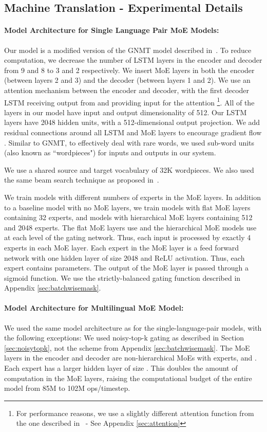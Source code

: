 \documentclass{article} \pdfoutput=1
\begin{document}
\subsection{Machine Translation - Experimental Details}
\label{sec:appendixmt}


\paragraph{Model Architecture for Single Language Pair MoE Models:} Our model is a modified version of the GNMT model described in~\citep{GNMT}.  To reduce computation, we decrease the number of LSTM layers in the encoder and decoder from 9 and 8 to 3 and 2 respectively.  We insert MoE layers in both the encoder (between layers 2 and 3) and the decoder (between layers 1 and 2). We use an attention mechanism between the encoder and decoder, with the first decoder LSTM receiving output from and providing input for the attention \footnote{For performance reasons, we use a slightly different attention function from the one described in~\citep{GNMT} - See Appendix \ref{sec:attention}}.  All of the layers in our model have input and output dimensionality of 512. Our LSTM layers have 2048 hidden units, with a 512-dimensional output projection.   We add residual connections around all LSTM and MoE layers to encourage gradient flow \citep{HeZRS:2015:DRL}. Similar to GNMT, to effectively deal with rare words, we used sub-word units (also known as ``wordpieces") \citep{Schuster:2012:JKVS} for inputs and outputs in our system. 

We use a shared source and target vocabulary of 32K wordpieces. We also used the same beam search technique as proposed in~\citep{GNMT}. 

We train models with different numbers of experts in the MoE layers.  In addition to a baseline model with no MoE layers, we train models with flat MoE layers containing 32 experts, and models with hierarchical MoE layers containing 512 and 2048 experts.  The flat MoE layers use  and the hierarchical MoE models use  at each level of the gating network. Thus, each input is processed by exactly 4 experts in each MoE layer.  Each expert in the MoE layer is a feed forward network with one hidden layer of size 2048 and ReLU activation.  Thus, each expert contains  parameters.  The output of the MoE layer is passed through a sigmoid function.   We use the strictly-balanced gating function described in Appendix \ref{sec:batchwisemask}.

\paragraph{Model Architecture for Multilingual MoE Model:} We used the same model architecture as for the single-language-pair models, with the following exceptions:  We used noisy-top-k gating as described in Section \ref{sec:noisytopk}, not the scheme from Appendix \ref{sec:batchwisemask}.  The MoE layers in the encoder and decoder are non-hierarchical MoEs with  experts, and .  Each expert has a larger hidden layer of size .  This doubles the amount of computation in the MoE layers, raising the computational budget of the entire model from 85M to 102M ops/timestep.
\end{document}
